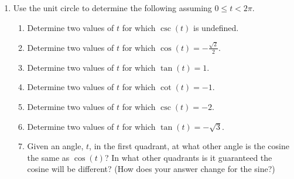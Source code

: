 \begin{enumerate}
  \begin{enumerate}[itemsep=2em]
  \end{enumerate}

\clearpage

\item Use the unit circle to determine the following assuming
  $0\leq t < 2\pi$.
\begin{enumerate}


\item Determine two values of $t$ for which $\csc(t)$ is undefined.
  \vfill

\item Determine two values of $t$ for which $\cos(t)=-\frac{\sqrt{2}}{2}$.
  \vfill

\item Determine two values of $t$ for which $\tan(t)=1$.
  \vfill

\item Determine two values of $t$ for which $\cot(t)=-1$.
  \vfill

\item Determine two values of $t$ for which $\csc(t)=-2$.
  \vfill

\item Determine two values of $t$ for which $\tan(t)=-\sqrt{3}$.
  \vfill

\item Given an angle, $t$, in the first quadrant, at what other angle
  is the cosine the same as $\cos(t)$? 
  In what other quadrants is it guaranteed  the cosine will be different?
  (How does your answer change for the sine?)
  \vfill

\end{enumerate}


\end{enumerate}

